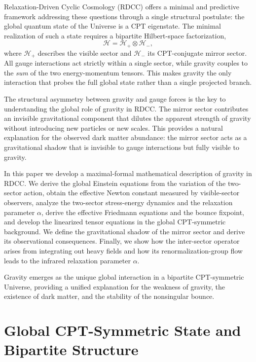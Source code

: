 \documentclass[11pt,a4paper]{article}
\begin{document}
Relaxation-Driven Cyclic Cosmology (RDCC) offers a minimal and predictive framework addressing these questions through a single structural postulate: the global quantum state of the Universe is a CPT eigenstate. The minimal realization of such a state requires a bipartite Hilbert-space factorization,
\begin{equation}
\mathcal{H} = \mathcal{H}_+ \otimes \mathcal{H}_-,
\end{equation}
where $\mathcal{H}_+$ describes the visible sector and $\mathcal{H}_-$ its CPT-conjugate mirror sector. All gauge interactions act strictly within a single sector, while gravity couples to the \emph{sum} of the two energy-momentum tensors. This makes gravity the only interaction that probes the full global state rather than a single projected branch.

The structural asymmetry between gravity and gauge forces is the key to understanding the global role of gravity in RDCC. The mirror sector contributes an invisible gravitational component that dilutes the apparent strength of gravity without introducing new particles or new scales. This provides a natural explanation for the observed dark matter abundance: the mirror sector acts as a gravitational shadow that is invisible to gauge interactions but fully visible to gravity.

In this paper we develop a maximal-formal mathematical description of gravity in RDCC. We derive the global Einstein equations from the variation of the two-sector action, obtain the effective Newton constant measured by visible-sector observers, analyze the two-sector stress-energy dynamics and the relaxation parameter $\alpha$, derive the effective Friedmann equations and the bounce fixpoint, and develop the linearized tensor equations in the global CPT-symmetric background. We define the gravitational shadow of the mirror sector and derive its observational consequences. Finally, we show how the inter-sector operator arises from integrating out heavy fields and how its renormalization-group flow leads to the infrared relaxation parameter $\alpha$.

Gravity emerges as the unique global interaction in a bipartite CPT-symmetric Universe, providing a unified explanation for the weakness of gravity, the existence of dark matter, and the stability of the nonsingular bounce.
\section{Global CPT-Symmetric State and Bipartite Structure}
\end{document}
